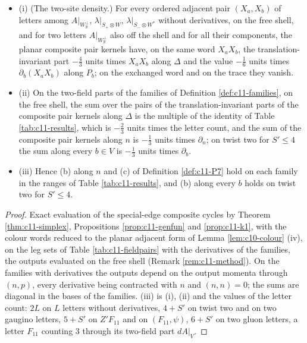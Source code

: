 \begin{theorem}
\label{thm:c11-families}
\begin{itemize}
\item (i) (The two-site density.) For every ordered adjacent pair $(X_a,X_b)$ of letters among $A|_{W_{\mathbb R}^\perp}$, $\lambda|_{S_+\otimes W}$, $\lambda|_{S_-\otimes W^*}$ without derivatives, on the free shell, and for two letters $A|_{W_{\mathbb R}^\perp}$ also off the shell and for all their components, the planar composite pair kernels have, on the same word $X_aX_b$, the translation-invariant part $-\tfrac43$ units times $X_aX_b$ along $\Delta$ and the value $-\tfrac16$ units times $\partial_b(X_aX_b)$ along $P_b$; on the exchanged word and on the trace they vanish.
\item (ii) On the two-field parts of the families of Definition \ref{def:c11-families}, on the free shell, the sum over the pairs of the translation-invariant parts of the composite pair kernels along $\Delta$ is the multiple of the identity of Table \ref{tab:c11-results}, which is $-\tfrac23$ units times the letter count, and the sum of the composite pair kernels along $n$ is $-\tfrac13$ units times $\partial_n$; on twist two for $S'\le4$ the sum along every $b\in V$ is $-\tfrac13$ units times $\partial_b$.
\item (iii) Hence (b) along $n$ and (c) of Definition \ref{def:c11-P7} hold on each family in the ranges of Table \ref{tab:c11-results}, and (b) along every $b$ holds on twist two for $S'\le4$.
\end{itemize}
\end{theorem}

\begin{proof}
Exact evaluation of the special-edge composite cycles by Theorem \ref{thm:c11-simplex}, Propositions \ref{prop:c11-genfun} and \ref{prop:c11-k1}, with the colour words reduced to the planar adjacent form of Lemma \ref{lem:c10-colour} (iv), on the leg sets of Table \ref{tab:c11-fieldpairs} with the derivatives of the families, the outputs evaluated on the free shell (Remark \ref{rem:c11-method}). On the families with derivatives the outputs depend on the output momenta through $(n,p)$, every derivative being contracted with $n$ and $(n,n)=0$; the sums are diagonal in the bases of the families. (iii) is (i), (ii) and the values of the letter count: $2L$ on $L$ letters without derivatives, $4+S'$ on twist two and on two gaugino letters, $5+S'$ on $Z'F_{11}$ and on $(F_{11},\psi)$, $6+S'$ on two gluon letters, a letter $F_{11}$ counting $3$ through its two-field part $dA|_V$.
\end{proof}

